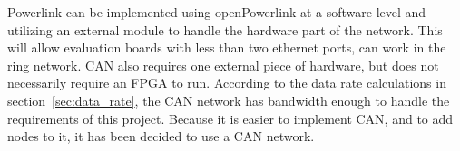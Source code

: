 Powerlink can be implemented using openPowerlink at a software level and utilizing an external module to handle the hardware part of the network.
This will allow evaluation boards with less than two ethernet ports, can work in the ring network. 
CAN also requires one external piece of hardware, but does not necessarily require an FPGA to run. 
According to the data rate calculations in section~\ref{sec:data_rate}, the CAN network has bandwidth enough to handle the requirements of this project. 
Because it is easier to implement CAN, and to add nodes to it, it has been decided to use a CAN network.